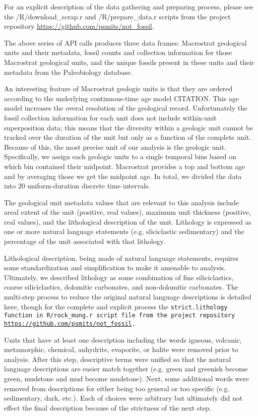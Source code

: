 \documentclass[12pt,letterpaper]{article}
\begin{document}
For an explicit description of the data gathering and preparing process, please see the /R/download\_scrap.r and /R/prepare\_data.r scripts from the project repository \url{https://github.com/psmits/not\_fossil}.

The above series of API calls produces three data frames: Macrostrat geological units and their metadata, fossil counts and collection information for those Macrostrat geological units, and the unique fossils present in these units and their metadata from the Paleobiology database. 

An interesting feature of Macrostrat geologic units is that they are ordered according to the underlying continuous-time age model CITATION. This age model increases the overal resolution of the geological record. Unfortunately the fossil collection information for each unit does not include within-unit superposition data; this means that the diversity within a geologic unit cannot be tracked over the duration of the unit but only as a function of the complete unit. Because of this, the most precise unit of our analysis is the geologic unit. Specifically, we assign each geologic units to a single temporal bins based on which bin contained their midpoint. Macrostrat provides a top and bottom age and by averaging those we get the midpoint age. In total, we divided the data into 20 uniform-duration discrete time intervals.

The geological unit metadata values that are relevant to this analysis include areal extent of the unit (positive, real values), maximum unit thickness (positive, real values), and the lithological description of the unit. Lithology is expressed as one or more natural language statements (e.g. sliciclastic sedimentary) and the percentage of the unit associated with that lithology.

Lithological description, being made of natural language statements, requires some standardization and simplification to make it amenable to analysis. Ultimately, we described lithology as some combination of fine siliciclastics, coarse siliciclastics, dolomitic carbonates, and non-dolomitic carbonates. The multi-step process to reduce the original natural language descriptions is detailed here, though for the complete and explicit process the \tt{strict.lithology} function in R/rock\_mung.r script file from the project repository \url{https://github.com/psmits/not\_fossil}.

Units that have at least one description including the words igneous, volcanic, metamorphic, chemical, anhydrite, evaporite, or halite were removed prior to analysis.
After this step, descriptive terms were unified so that the natural language descriptions are easier match together (e.g. green and greenish become green, mudstone and mud become mudstone). Next, some additional words were removed from descriptions for either being too general or too specific (e.g. sedimentary, dark, etc.). Each of choices were arbitrary but ultimately did not effect the final description because of the strictness of the next step.
\end{document}
